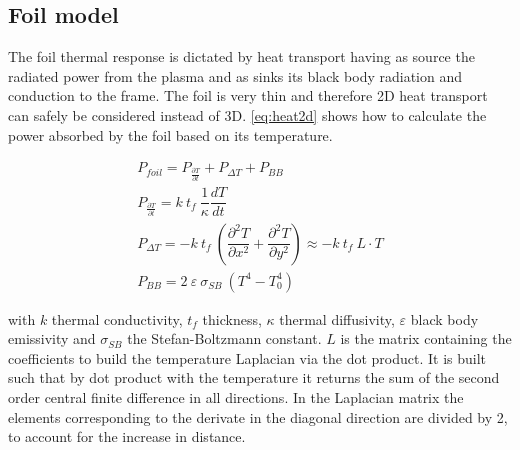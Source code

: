 \subsection{Foil model}
The foil thermal response is dictated by heat transport having as source the radiated power from the plasma and as sinks its black body radiation and conduction to the frame. The foil is very thin and therefore 2D heat transport can safely be considered instead of 3D. \autoref{eq:heat2d} shows how to calculate the power absorbed by the foil based on its temperature.

\begin{equation}
\begin{split}
P_{foil}= P_{\frac {\partial T} {\partial t}}+P_{\Delta T}+P_{BB}\\
P_{\frac {\partial T} {\partial t}}=k \: t_f \: \dfrac{1}{\kappa} \dfrac{dT}{dt} \\
 P_{\Delta T} = -k \: t_f \:  \left( \dfrac{\partial^2 T}{\partial x^2} + \dfrac{\partial^2 T}{\partial y^2} \right) \approx -k \: t_f \: L \cdot T \\ P_{BB} = 2 \: \varepsilon \: \sigma_{SB} \: (T^4 - T_0^4)
\label{eq:heat2d}
\end{split}
\end{equation}

with $k$ thermal conductivity, $t_f$  thickness, $\kappa$ thermal diffusivity, $\varepsilon$ black body emissivity and $\sigma_{SB}$ the Stefan-Boltzmann constant. $L$ is the matrix containing the coefficients to build the temperature Laplacian via the dot product. It is built such that by dot product with the temperature it returns the sum of the second order central finite difference in all directions. In the Laplacian matrix the elements corresponding to the derivate in the diagonal direction are divided by 2, to account for the increase in distance.

